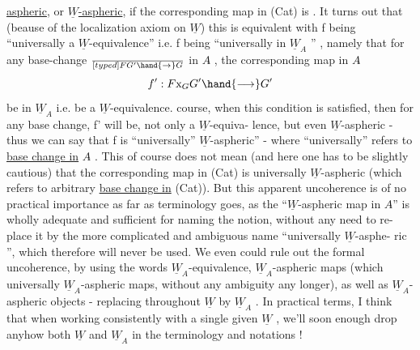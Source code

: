
\uline{aspheric}, or \uline{$\underline{W}$-aspheric}, if the corresponding map in (Cat) is . It
\margin{|}turns out that  (beause of the localization axiom on $\underline{W}$) this
is equivalent with f being ``universally a $\underline{W}$-equivalence'' i.e. f being
``universally in $\underline{W}_A$ '' , namely that for any base-change $\over[typed]{F}{G}'\hand{\to}G$ in $A\hat{}$ ,
the corresponding map in $A\hat{}$
\[ f' : F\mathrm{x}_G G' \hand{\longrightarrow} G' \]
be in $\underline{W}_A$ i.e. be a $\underline{W}$-equivalence.  course, when this condition is
satisfied, then for any base change, f' will be, not only a $\underline{W}$-equiva-%
lence, but even $\underline{W}$-aspheric - thus we can say that f is ``universally''
$\underline{W}$-aspheric'' - where ``universally'' refers to \uline{base change in} $A\hat{}$ . This of
course does not mean (and here one has to be slightly cautious) that
the corresponding map in (Cat) is universally $\underline{W}$-aspheric (which 
refers to arbitrary \uline{base change in} (Cat)). But this 
apparent uncoherence is of no practical importance as far as terminology
goes, as the  ``$\underline{W}$-aspheric map in $A\hat{}$''  is wholly 
adequate and sufficient for naming the notion, without any need to re-%
place it by the more complicated and ambiguous name ``universally $\underline{W}$-asphe-%
ric '', which therefore will never be used. We even could rule out the
formal uncoherence, by using the words $\underline{W}_A$-equivalence, $\underline{W}_A$-aspheric
maps (which  universally $\underline{W}_A$-aspheric maps, without any ambiguity
any longer), as well as $\underline{W}_A$-aspheric objects - replacing throughout $\underline{W}$
by $\underline{W}_A$ . In practical terms, I think that when working consistently with
a single given $\underline{W}$ , we'll soon enough drop anyhow both $\underline{W}$ and $\underline{W}_A$ in the
terminology and notations !

